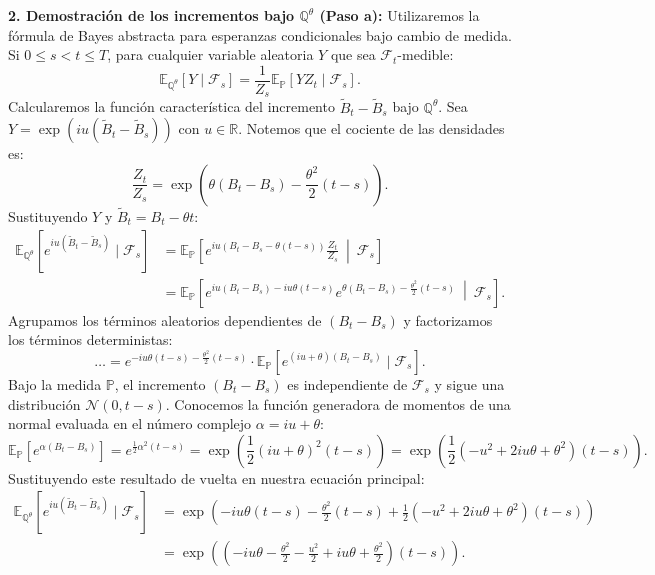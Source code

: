 \documentclass[11pt, letterpaper]{article}
\begin{document}
\begin{solucion}
    \textbf{2. Demostración de los incrementos bajo $\mathbb{Q}^\theta$ (Paso a):}
    Utilizaremos la fórmula de Bayes abstracta para esperanzas condicionales bajo cambio de medida. Si $0 \le s < t \le T$, para cualquier variable aleatoria $Y$ que sea $\mathcal{F}_t$-medible:
    \[ \mathbb{E}_{\mathbb{Q}^\theta}[Y \mid \mathcal{F}_s] = \frac{1}{Z_s} \mathbb{E}_{\mathbb{P}}[Y Z_t \mid \mathcal{F}_s]. \]
    Calcularemos la función característica del incremento $\tilde{B}_t - \tilde{B}_s$ bajo $\mathbb{Q}^\theta$. Sea $Y = \exp(iu(\tilde{B}_t - \tilde{B}_s))$ con $u \in \mathbb{R}$.
    Notemos que el cociente de las densidades es:
    \[ \frac{Z_t}{Z_s} = \exp\left( \theta(B_t - B_s) - \frac{\theta^2}{2}(t - s) \right). \]
    Sustituyendo $Y$ y $\tilde{B}_t = B_t - \theta t$:
    \begin{align*}
        \mathbb{E}_{\mathbb{Q}^\theta}[e^{iu(\tilde{B}_t - \tilde{B}_s)} \mid \mathcal{F}_s] &= \mathbb{E}_{\mathbb{P}}\left[ e^{iu(B_t - B_s - \theta(t - s))} \frac{Z_t}{Z_s} \ \middle|\ \mathcal{F}_s \right] \\
        &= \mathbb{E}_{\mathbb{P}}\left[ e^{iu(B_t - B_s) - iu\theta(t - s)} e^{\theta(B_t - B_s) - \frac{\theta^2}{2}(t - s)} \ \middle|\ \mathcal{F}_s \right].
    \end{align*}
    Agrupamos los términos aleatorios dependientes de $(B_t - B_s)$ y factorizamos los términos deterministas:
    \[ \dots = e^{-iu\theta(t - s) - \frac{\theta^2}{2}(t - s)} \cdot \mathbb{E}_{\mathbb{P}}\left[ e^{(iu + \theta)(B_t - B_s)} \mid \mathcal{F}_s \right]. \]
    Bajo la medida $\mathbb{P}$, el incremento $(B_t - B_s)$ es independiente de $\mathcal{F}_s$ y sigue una distribución $\mathcal{N}(0, t-s)$. Conocemos la función generadora de momentos de una normal evaluada en el número complejo $\alpha = iu + \theta$:
    \[ \mathbb{E}_{\mathbb{P}}\left[ e^{\alpha(B_t - B_s)} \right] = e^{\frac{1}{2}\alpha^2(t - s)} = \exp\left( \frac{1}{2}(iu + \theta)^2 (t - s) \right) = \exp\left( \frac{1}{2}(-u^2 + 2iu\theta + \theta^2)(t - s) \right). \]
    Sustituyendo este resultado de vuelta en nuestra ecuación principal:
    \begin{align*}
        \mathbb{E}_{\mathbb{Q}^\theta}[e^{iu(\tilde{B}_t - \tilde{B}_s)} \mid \mathcal{F}_s] &= \exp\left( -iu\theta(t - s) - \frac{\theta^2}{2}(t - s) + \frac{1}{2}(-u^2 + 2iu\theta + \theta^2)(t - s) \right) \\
        &= \exp\left( \left( -iu\theta - \frac{\theta^2}{2} - \frac{u^2}{2} + iu\theta + \frac{\theta^2}{2} \right)(t - s) \right).
    \end{align*}

\end{solucion}
\end{document}
